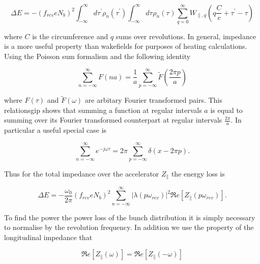 \documentclass{cernyrep}
\begin{document}
\begin{equation}
\Delta E = - \left( f_{rev} e N_{b}\right)^{2} \int^{\infty}_{-\infty} d\tau^{'} \rho_{n} \left( \tau^{'} \right) \int^{\infty}_{-\infty} d\tau^{} \rho_{n} \left( \tau^{} \right) \displaystyle\sum\limits_{q = 0}^{\infty} W_{\parallel, q} \left( q\frac{C}{c} + \tau^{'} - \tau \right)  
\label{eqn:sum_wake_loss}
\end{equation}

where $C$ is the circumference and $q$ sums over revolutions. In general, impedance is a more useful property than wakefields for purposes of heating calculations. Using the Poisson sum formalism and the following identity

\begin{equation}
\displaystyle\sum\limits_{n = -\infty}^{\infty} F \left( n a \right) = \frac{1}{a} \displaystyle\sum\limits_{p = -\infty}^{\infty} \tilde{F} \left( \frac{2\pi p}{a} \right)
\end{equation}

where $F(\tau)$ and $\tilde{F}(\omega)$ are arbitary Fourier transformed pairs. This relationsgip shows that summing a function at regular intervals $a$ is equal to summing over its Fourier transformed counterpart at regular intervals $\frac{2 \pi}{a}$. In particular a useful special case is

\begin{equation}
\displaystyle\sum\limits_{n = -\infty}^{\infty} e^{-j\omega \tau} = 2\pi \displaystyle\sum\limits_{p = -\infty}^{\infty} \delta \left( x - 2\pi p \right).
\end{equation}

Thus for the total impedance over the accelerator $Z_{\parallel}$ the energy loss is

\begin{equation}
\Delta E = -\frac{\omega_{0}}{2\pi} \left( f_{rev} e N_{b}\right)^{2} \displaystyle\sum\limits_{n = -\infty}^{\infty}  \left| \lambda \left( p \omega_{rev} \right)  \right|^{2} \Re{}e \left[ Z_{\parallel} \left( p \omega_{rev} \right) \right].
\end{equation}

To find the power the power loss of the bunch distribution it is simply necessary to normalise by the revolution frequency. In addition we use the property of the longitudinal impedance that 

\begin{equation}
\Re{}e \left[ Z_{\parallel} \left( \omega \right) \right] =  \Re{}e \left[ Z_{\parallel} \left( -\omega \right) \right]
\end{equation}
\end{document}
